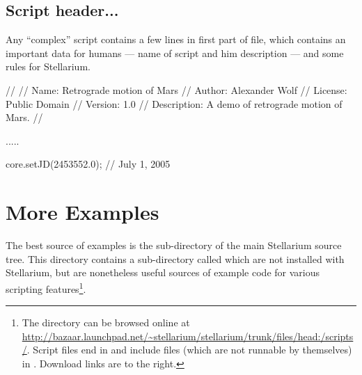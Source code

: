 \subsection{Script header...}
Any ``complex'' script contains a few lines in first part of file, which contains an important data for humans --- name of script and him description --- and some rules for Stellarium.

\begin{script}
//
// Name: Retrograde motion of Mars
// Author: Alexander Wolf
// License: Public Domain
// Version: 1.0
// Description: A demo of retrograde motion of Mars.
//
\end{script}
.....
\begin{script}
core.setJD(2453552.0); // July 1, 2005
\end{script}

\section{More Examples}
\label{sec:scripting:examples}
The best source of examples is the  sub-directory of the
main Stellarium source tree. This directory contains a sub-directory
called  which are not installed with Stellarium, but are
nonetheless useful sources of example code for various scripting
features\footnote{The directory can be browsed online at
  \url{http://bazaar.launchpad.net/~stellarium/stellarium/trunk/files/head:/scripts/}. Script
  files end in  and include files (which are not runnable
  by themselves) in . Download links are to the right.}.




